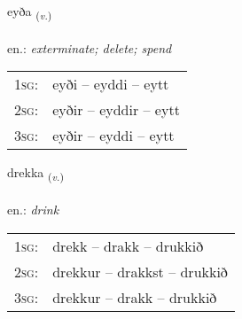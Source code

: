\documentclass[frontgrid, backgrid]{flacards}\usepackage[]{graphicx}\usepackage[]{xcolor}
\begin{document}
\renewcommand{\blhead}{\vskip5pt {\small\bfseries\footnotesize Sagnorð | Verb }}
\renewcommand{\bcfoot}{\vskip5pt \hspace{2pt}{\small\bfseries\footnotesize 1K}}


{eyða \small{\textsubscript{(\textit{v.})}} \\[1ex] %
\textphonetic{[eiːða]} \\
en.: \emph{exterminate; delete; spend} \\  [2ex]
\renewcommand*{\arraystretch}{0.8}
\begin{tabular}{p{1cm}l}
\textsc{1sg}: & eyði -- eyddi -- eytt \\ 
\textsc{2sg}: & eyðir -- eyddir -- eytt \\ 
\textsc{3sg}: & eyðir -- eyddi -- eytt \\ 
\end{tabular}
}

\renewcommand{\flhead}{\vskip5pt \fboxsep=0pt {\small\bfseries\footnotesize Sagnorð | Verb}}
\renewcommand{\fcfoot}{\vskip5pt \fboxsep=0pt \hspace{2pt}{\small\bfseries\footnotesize 1K}}

\renewcommand{\blhead}{\vskip5pt {\small\bfseries\footnotesize Sagnorð | Verb }}
\renewcommand{\bcfoot}{\vskip5pt \hspace{2pt}{\small\bfseries\footnotesize 1K}}


{drekka \small{\textsubscript{(\textit{v.})}} \\[1ex] %
\textphonetic{[trɛhka]} \\
en.: \emph{drink} \\  [2ex]
\renewcommand*{\arraystretch}{0.8}
\begin{tabular}{p{1cm}l}
\textsc{1sg}: & drekk -- drakk -- drukkið \\ 
\textsc{2sg}: & drekkur -- drakkst -- drukkið \\ 
\textsc{3sg}: & drekkur -- drakk -- drukkið \\ 
\end{tabular}
}
\end{document}
